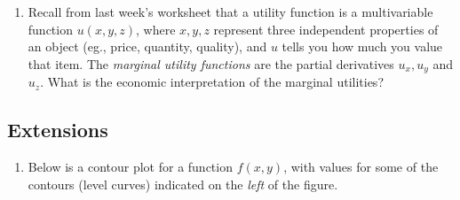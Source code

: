 {\begin{enumerate}[resume]
	where $C$ is the speed of sound in meters/second, $T$ is the temprature in degrees Celsius, $S$ is the salinity in grams/liter of water, and $D$ is the depth below the ocean surface in meters.
	
	\begin{enumerate}
		\item State the units in which each of the partial derivatives $C_T,C_S,$ and $C_D$ are expressed and explain the physical meaning of each.
		
		\item Find the partial derivatives $C_T, C_S,$ and $C_D$.
		
		\item Evaluate each of the three partial derivatives at the point where $T=10, S=35$, and $D=100$.  What does the sign of each partial derivative tell us about the behavior of the function $C$ at the point $(10,35,100)$?
	\end{enumerate}
    \pagebreak 
    
    \item Recall from last week's worksheet that a utility function is a multivariable function $u(x,y,z)$, where $x,y,z$ represent three independent properties of an object (eg., price, quantity, quality), and $u$ tells you how much you value that item. The \textit{marginal utility functions} are the partial derivatives $u_x,u_y$ and $u_z$. What is the economic interpretation of the marginal utilities? 
\end{enumerate}
\subsection*{Extensions}
\begin{enumerate}[resume]
	
	\item Below is a contour plot for a function $f(x,y)$, with values for some of the contours (level curves) indicated on the \textit{left} of the figure.
	

\end{enumerate}}
